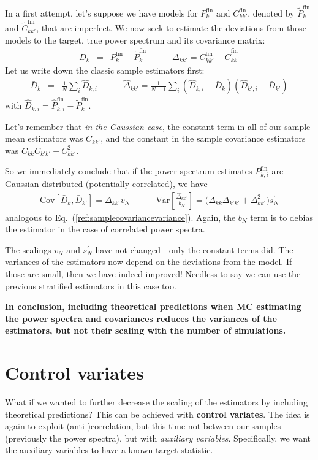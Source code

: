 \documentclass{aastex6}
\newcommand{\equref}[1]{{\xspace}Eq.~(\ref{#1})}
\newcommand{\eqn}[1]{\begin{eqnarray}#1\end{eqnarray}}
\begin{document}
In a first attempt, let's suppose we have models for $P^\mathrm{fin}_k$ and $C_{kk'}^\mathrm{fin}$, denoted by $\tilde{P}^\mathrm{fin}_k$ and $\tilde{C}_{kk'}^\mathrm{fin}$, that are imperfect.
We now seek to estimate the deviations from those models to the target, true power spectrum and its covariance matrix:
\eqn{
	{D}_k &=&P^\mathrm{fin}_k - \tilde{P}^\mathrm{fin}_k		 \quad \quad\quad
	\Delta_{kk'} = C_{kk'}^\mathrm{fin}  - \tilde{C}_{kk'}^\mathrm{fin}
}
Let us write down the classic sample estimators first:
\eqn{
	\bar{D}_k &=&	\frac{1}{N} \sum_{i} \hat{D}_{k, i}	 \quad \quad\quad
	\hat{\Delta}_{kk'} = \frac{1}{N-1} \sum_{i} \left( \hat{D}_{k, i} - \bar{D}_{k} \right) \left( \hat{D}_{k', i} - \bar{D}_{k'} \right)
}
with $\hat{D}_{k, i} = \hat{P}^\mathrm{fin}_{k, i} - \tilde{P}^\mathrm{fin}_k$.

Let's remember that \textit{in the Gaussian case}, the constant term in all of our sample mean estimators was $C_{kk'}$, and the constant in the sample covariance estimators was ${C}_{kk}{C}_{k'k'} + {C}_{kk'}^2$. 


So we immediately conclude that if the power spectrum estimates $P^\mathrm{fin}_{k, i}$ are Gaussian distributed (potentially correlated), we have
\eqn{
	\mathrm{Cov}[\bar{D}_k, \bar{D}_{k'}] = \Delta_{kk'} v_N \quad \quad\quad
	 \mathrm{Var}\left[ \frac{\hat{\Delta}_{kk'}}{b_N}\right]  = \bigl(\Delta_{kk}\Delta_{k'k'} + \Delta_{kk'}^2 \bigr) s_N^\prime  
}
analogous to \equref{ref:samplecovariancevariance}. Again, the $b_N$ term is to debias the estimator in the case of correlated power spectra.

The scalings $v_N$ and $s_N^\prime$ have not changed - only the constant terms did. The variances of the estimators now depend on the deviations from the model. 
If those are small, then we have indeed improved!
Needless to say we can use the previous stratified estimators in this case too. 

\textbf{In conclusion, including theoretical predictions when MC estimating the power spectra and covariances reduces the variances of the estimators, but not their scaling with the number of simulations.} 


\section{Control variates}

What if we wanted to further decrease the scaling of the estimators by including theoretical predictions? 
This can be achieved with \textbf{control variates}.
The idea is again to exploit (anti-)correlation, but this time not between our samples (previously the power spectra), but with \textit{auxiliary variables}.
Specifically, we want the auxiliary variables to have a known target statistic. 
\end{document}
